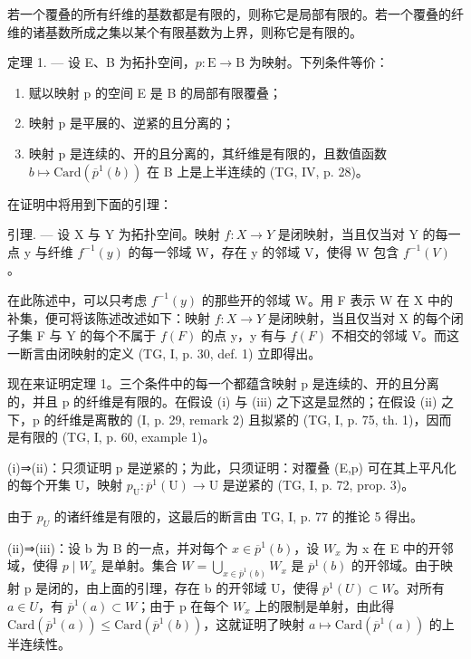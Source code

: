 若一个覆叠的所有纤维的基数都是有限的，则称它是局部有限的。若一个覆叠的纤维的诸基数所成之集以某个有限基数为上界，则称它是有限的。

定理 1. --- 设 E、B 为拓扑空间，\(p\colon\mathrm{E}\to\mathrm{B}\) 为映射。下列条件等价：

\begin{enumerate}
\def\labelenumi{(\roman{enumi})}
\item
  赋以映射 p 的空间 E 是 B 的局部有限覆叠；
\item
  映射 p 是平展的、逆紧的且分离的；
\item
  映射 p 是连续的、开的且分离的，其纤维是有限的，且数值函数 \(b \mapsto \text{Card}(\overline{p}^{1}(b))\) 在 B 上是上半连续的 (TG, IV, p. 28)。
\end{enumerate}

在证明中将用到下面的引理：

引理. — 设 X 与 Y 为拓扑空间。映射 \(f: X \to Y\) 是闭映射，当且仅当对 Y 的每一点 y 与纤维 \(f^{-1}(y)\) 的每一邻域 W，存在 y 的邻域 V，使得 W 包含 \(f^{-1}(V)\) 。

在此陈述中，可以只考虑 \(f^{-1}(y)\) 的那些开的邻域 W。用 F 表示 W 在 X 中的补集，便可将该陈述改述如下：映射 \(f: X \to Y\) 是闭映射，当且仅当对 X 的每个闭子集 F 与 Y 的每个不属于 \(f(F)\) 的点 y，y 有与 \(f(F)\) 不相交的邻域 V。而这一断言由闭映射的定义 (TG, I, p. 30, def. 1) 立即得出。

现在来证明定理 1。三个条件中的每一个都蕴含映射 p 是连续的、开的且分离的，并且 p 的纤维是有限的。在假设 (i) 与 (iii) 之下这是显然的；在假设 (ii) 之下，p 的纤维是离散的 (I, p. 29, remark 2) 且拟紧的 (TG, I, p. 75, th. 1)，因而是有限的 (TG, I, p. 60, example 1)。

(i)⇒(ii)：只须证明 p 是逆紧的；为此，只须证明：对覆叠 (E,p) 可在其上平凡化的每个开集 U，映射 \(p_{\mathrm{U}}\colon \overline{p}^{1}(\mathrm{U})\to\mathrm{U}\) 是逆紧的 (TG, I, p. 72, prop. 3)。

由于 \(p_{U}\) 的诸纤维是有限的，这最后的断言由 TG, I, p. 77 的推论 5 得出。

(ii)⇒(iii)：设 b 为 B 的一点，并对每个 \(x \in \overline{p}^{1}(b)\)，设 \(W_{x}\) 为 x 在 E 中的开邻域，使得 \(p \mid W_{x}\) 是单射。集合 \(W = \bigcup_{x \in \overline{p}^{1}(b)} W_{x}\) 是 \(\overline{p}^{1}(b)\) 的开邻域。由于映射 p 是闭的，由上面的引理，存在 b 的开邻域 U，使得 \(\overline{p}^{1}(U) \subset W\)。对所有 \(a \in U\)，有 \(\overline{p}^{1}(a) \subset W\)；由于 p 在每个 \(W_{x}\) 上的限制是单射，由此得 \(\text{Card}(\overline{p}^{1}(a)) \leqslant \text{Card}(\overline{p}^{1}(b))\)，这就证明了映射 \(a \mapsto \text{Card}(\overline{p}^{1}(a))\) 的上半连续性。

